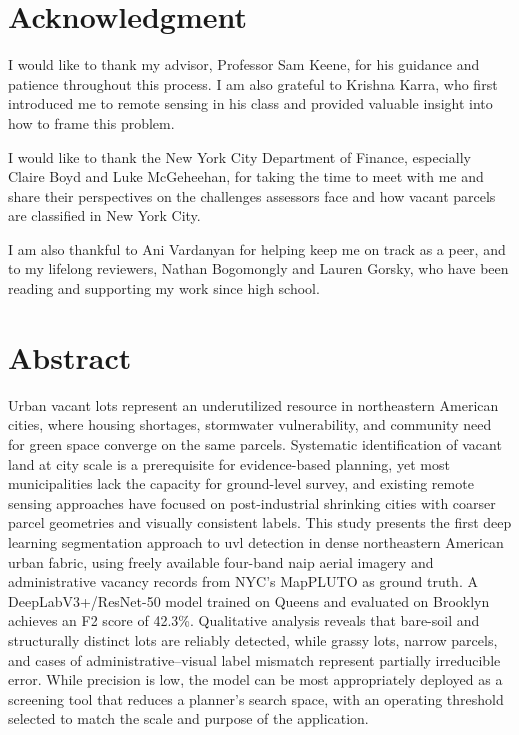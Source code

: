 \chapter*{Acknowledgment}

I would like to thank my advisor, Professor Sam Keene, for his guidance and patience throughout this process. I am also grateful to Krishna Karra, who first introduced me to remote sensing in his class and provided valuable insight into how to frame this problem.

I would like to thank the New York City Department of Finance, especially Claire Boyd and Luke McGeheehan, for taking the time to meet with me and share their perspectives on the challenges assessors face and how vacant parcels are classified in New York City.

I am also thankful to Ani Vardanyan for helping keep me on track as a peer, and to my lifelong reviewers, Nathan Bogomongly and Lauren Gorsky, who have been reading and supporting my work since high school.

\clearpage

\chapter*{Abstract}

Urban vacant lots represent an underutilized resource in northeastern American cities, where housing shortages, stormwater vulnerability, and community need for green space converge on the same parcels. Systematic identification of vacant land at city scale is a prerequisite for evidence-based planning, yet most municipalities lack the capacity for ground-level survey, and existing remote sensing approaches have focused on post-industrial shrinking cities with coarser parcel geometries and visually consistent labels. This study presents the first deep learning segmentation approach to \acrshort{uvl} detection in dense northeastern American urban fabric, using freely available four-band \acrshort{naip} aerial imagery and administrative vacancy records from NYC's MapPLUTO as ground truth. A DeepLabV3+/ResNet-50 model trained on Queens and evaluated on Brooklyn achieves an F2 score of 42.3\%. Qualitative analysis reveals that bare-soil and structurally distinct lots are reliably detected, while grassy lots, narrow parcels, and cases of administrative--visual label mismatch represent partially irreducible error. While precision is low, the model can be most appropriately deployed as a screening tool that reduces a planner's search space, with an operating threshold selected to match the scale and purpose of the application.

